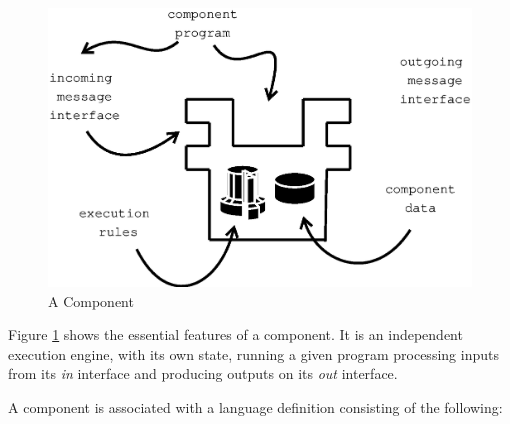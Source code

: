 \documentclass{article}
\begin{document}
\begin{figure}
\begin{center}
\includegraphics[scale=0.5]{Component.eps}
\end{center}
\caption{A Component}
\label{Component}
\end{figure}

Figure \ref{Component} shows the essential features of a component. It is an independent
execution engine, with its own state, running a given program processing inputs from its
{\em in} interface and producing outputs on its {\em out} interface. 

A component is associated with a language definition consisting of the following:
\end{document}

